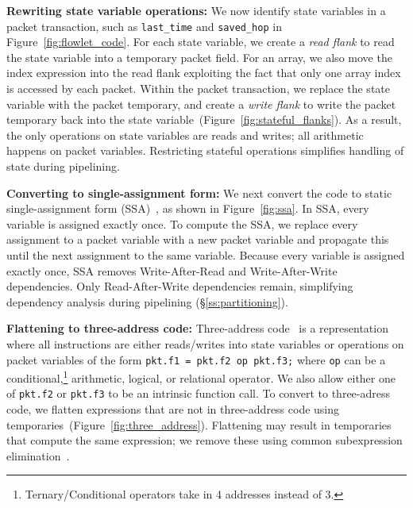 \textbf{Rewriting state variable operations: }We now identify state variables
in a packet transaction, such as \texttt{last\_time} and \texttt{saved\_hop} in
Figure~\ref{fig:flowlet_code}.  For each state variable, we create a
\textit{read flank} to read the state variable into a temporary packet field.
For an array, we also move the index expression into the read flank exploiting
the fact that only one array index is accessed by each packet.  Within the
packet transaction, we replace the state variable with the packet temporary,
and create a \textit{write flank} to write the packet temporary back into the
state variable~(Figure~\ref{fig:stateful_flanks}). As a result, the only
operations on state variables are reads and writes; all arithmetic happens on
packet variables. Restricting stateful operations simplifies handling of state
during pipelining.

\textbf{Converting to single-assignment form: }We next convert the
code to static single-assignment form (SSA)~\cite{ssa}, as shown in
Figure~\ref{fig:ssa}. In SSA, every variable is assigned exactly
once. To compute the SSA, we replace every assignment to a packet
variable with a new packet variable and propagate this until the next
assignment to the same variable.  Because every variable is assigned
exactly once, SSA removes Write-After-Read and Write-After-Write
dependencies.  Only Read-After-Write dependencies remain, simplifying
dependency analysis during pipelining (\S\ref{ss:partitioning}).

\textbf{Flattening to three-address code: } Three-address code~\cite{tac} is a
representation where all instructions are either reads/writes into state
variables or operations on packet variables of the form \texttt{pkt.f1 = pkt.f2
op pkt.f3;} where \texttt{op} can be a
conditional,\footnote{Ternary/Conditional operators take in 4 addresses instead
of 3.} arithmetic, logical, or relational operator.  We also allow either one
of {\tt pkt.f2} or {\tt pkt.f3} to be an intrinsic function call.  To convert
to three-adress code, we flatten expressions that are not in three-address code
using temporaries~(Figure~\ref{fig:three_address}).  Flattening may result in
temporaries that compute the same expression; we remove these using common
subexpression elimination~\cite{cse}.


